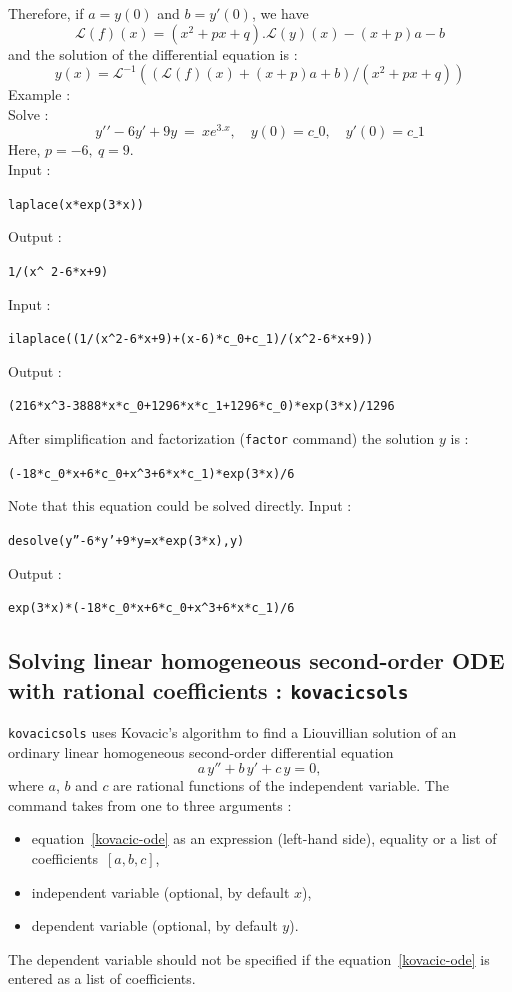 \documentclass[a4paper,11pt]{book}
\begin{document}
Therefore, if $a=y(0)$ and $b=y'(0)$, we have
$${\mathcal{L}}(f)(x)=(x^2+p x+q).{\mathcal{L}}(y)(x)-(x+p) a-b$$
and the solution of the differential equation is :
\[ y(x)=
{\mathcal{L}}^{-1}(({\mathcal{L}}(f)(x)+(x+p) a +b)/(x^2+p x+q))
\]
Example :\\
Solve :
\[ y\prime \prime -6 y\prime+9 y \ =\ x e^{3. x},
\quad  y(0)=c\_0, \quad y\prime(0)=c\_1
\]
Here, $p=-6,\ q=9$.\\
Input :
\begin{center}{\tt laplace(x*exp(3*x))}\end{center}
Output :
\begin{center}{\tt 1/(x\verb|^| 2-6*x+9)}\end{center}
Input :
\begin{center}{\tt ilaplace((1/(x\verb|^|2-6*x+9)+(x-6)*c\_0+c\_1)/(x\verb|^|2-6*x+9))}\end{center}
Output :
\begin{center}{\tt (216*x\verb|^|3-3888*x*c\_0+1296*x*c\_1+1296*c\_0)*exp(3*x)/1296}\end{center}
After simplification and factorization ({\tt factor} command) 
the solution $y$ is :
\begin{center}{\tt (-18*c\_0*x+6*c\_0+x\verb|^|3+6*x*c\_1)*exp(3*x)/6}\end{center}
Note that this equation could be solved directly.
Input :
\begin{center}{\tt desolve(y''-6*y'+9*y=x*exp(3*x),y)}\end{center}
Output :
\begin{center}{\tt exp(3*x)*(-18*c\_0*x+6*c\_0+x\verb|^|3+6*x*c\_1)/6}\end{center}

\subsection{Solving linear homogeneous second-order ODE with rational coefficients : {\tt kovacicsols}}
{\tt kovacicsols} uses Kovacic's algorithm to find a Liouvillian solution of an ordinary linear homogeneous second-order differential equation
\begin{equation}\label{kovacic-ode}a\,y''+b\,y'+c\,y=0,\end{equation}
where $a$, $b$ and $c$ are rational functions of the independent variable. The command takes from one to three arguments :
\begin{itemize}
  \item equation~\eqref{kovacic-ode} as an expression (left-hand side), equality or a list of coefficients~$[a,b,c]$,
  \item independent variable (optional, by default $x$),
  \item dependent variable (optional, by default $y$).
\end{itemize}
The dependent variable should not be specified if the equation~\eqref{kovacic-ode} is entered as a list of coefficients.
\end{document}
